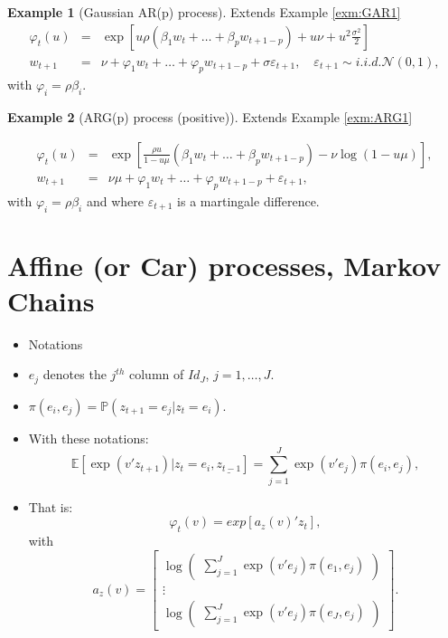 \documentclass[
  12pt,
]{book}
\theoremstyle{definition}
\theoremstyle{definition}
\newtheorem{example}{Example}[chapter]
\theoremstyle{definition}
\theoremstyle{definition}
\theoremstyle{remark}
\begin{document}
\begin{example}[Gaussian AR(p) process]
\protect\hypertarget{exm:ARp}{}\label{exm:ARp}Extends Example \ref{exm:GAR1}
\begin{eqnarray*}
\varphi_t(u) &=& \exp \left[ u \rho (\beta_1 w_t+\dots+\beta_p w_{t+1-p})+u\nu + u^2  \frac{\sigma^2}{2}\right]\\
w_{t+1} &=& \nu + \varphi_1 w_t +\dots+ \varphi_p w_{t+1-p}+\sigma \varepsilon_{t+1},\quad \varepsilon_{t+1} \sim i.i.d. \mathcal{N}(0,1),
\end{eqnarray*}
with \(\varphi_i = \rho \beta_i\).
\end{example}

\begin{example}[ARG(p) process (positive)]
\protect\hypertarget{exm:ARGp}{}\label{exm:ARGp}Extends Example \ref{exm:ARG1}

\begin{eqnarray*}
\varphi_t(u) &=& \exp\left[\frac{\rho u}{1-u \mu} (\beta_1 w_t+\dots+\beta_p w_{t+1-p})-\nu  \log(1-u\mu)\right],\\
w_{t+1} &=& \nu\mu + \varphi_1 w_t +\dots+ \varphi_p w_{t+1-p}+\varepsilon_{t+1},
\end{eqnarray*}
with \(\varphi_i = \rho \beta_i\) and where \(\varepsilon_{t+1}\) is a martingale difference.
\end{example}

\hypertarget{Markov}{%
\section{Affine (or Car) processes, Markov Chains}\label{Markov}}

\begin{itemize}
\item
  Notations
\item
  \(e_j\) denotes the \(j^{th}\) column of \(Id_J\), \(j=1,\dots,J\).
\item
  \(\pi(e_i, e_j) = \mathbb{P}(z_{t+1}=e_j | z_t=e_i)\).
\item
  With these notations:
  \[
  \mathbb{E}[\exp(v'z_{t+1})|z_t=e_i,\underline{z_{t-1}}] = \sum^J_{j=1} \exp(v'e_j)\pi (e_i, e_j),
  \]
\item
  That is:
  \[
  \varphi_t(v) = exp[a_z(v)'z_t],
  \]
  with
  \[
  a_z(v)= \left[ \begin{array}{l} \log \left(
  \begin{array}{l}  \sum^J_{j=1} \exp(v'e_j)  \pi(e_1,
  e_j) \end{array} \right)\\
  \vdots\\
  \log \left(
  \begin{array}{l}  \sum^J_{j=1} \exp(v'e_j)  \pi(e_J,
  e_j) \end{array} \right)
  \end{array}\right].
  \]
\end{itemize}
\end{document}
